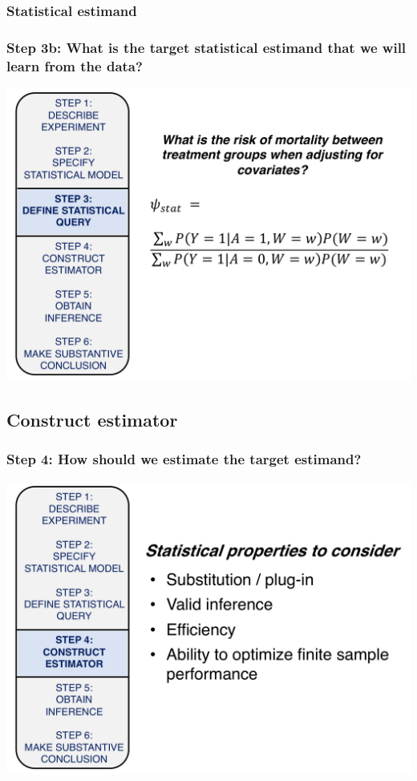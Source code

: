 \documentclass[t]{beamer}
\begin{document}
\subsubsection{Statistical estimand}
\begin{frame}
  \frametitle{Step 3b: What is the target statistical estimand that we will learn from the data?}
  \vspace{-20pt}
  \begin{center}
  \includegraphics[width = 1.05\textwidth]{figures/stat_estimand.pdf}
  \end{center}
\end{frame}

\subsection{Construct estimator}
\begin{frame}
  \frametitle{Step 4: How should we estimate the target estimand?}
  \vspace{-20pt}
  \begin{center}
  \includegraphics[width = 1.05\textwidth]{figures/roadmap4.pdf}
  \end{center}
\end{frame}
\end{document}
